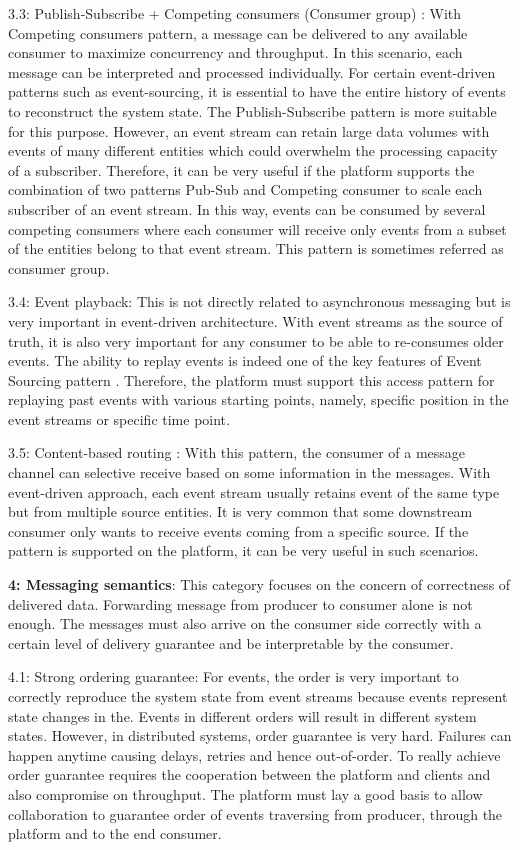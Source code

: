 3.3: Publish-Subscribe + Competing consumers (Consumer group) \cite{messagingcompetingconsumers}:
With Competing consumers pattern, a message can be delivered to any available consumer to maximize concurrency and throughput. In this scenario, each message can be interpreted and processed individually. For certain event-driven patterns such as event-sourcing, it is essential to have the entire history of events to reconstruct the system state. The Publish-Subscribe pattern is more suitable for this purpose. However, an event stream can retain large data volumes with events of many different entities which could overwhelm the processing capacity of a subscriber. Therefore, it can be very useful if the platform supports the combination of two patterns Pub-Sub and Competing consumer to scale each subscriber of an event stream. In this way, events can be consumed by several competing consumers where each consumer will receive only events from a subset of the entities belong to that event stream. This pattern is sometimes referred as consumer group.

3.4: Event playback: This is not directly related to asynchronous messaging but is very important in event-driven architecture. With event streams as the source of truth, it is also very important for any consumer to be able to re-consumes older events. The ability to replay events is indeed one of the key features of Event Sourcing pattern \cite{eventsourcingfowler}. Therefore, the platform must support this access pattern for replaying past events with various starting points, namely, specific position in the event streams or specific time point.

3.5: Content-based routing \cite{messagingcontainedbasedrouter}: 
With this pattern, the consumer of a message channel can selective receive based on some information in the messages. With event-driven approach, each event stream usually retains event of the same type but from multiple source entities. It is very common that some downstream consumer only wants to receive events coming from a specific source. If the pattern is supported on the platform, it can be very useful in such scenarios. 

\textbf{4: Messaging semantics}: This category focuses on the concern of correctness of delivered data. Forwarding message from producer to consumer alone is not enough. The messages must also arrive on the consumer side correctly with a certain level of delivery guarantee and be interpretable by the consumer. 

4.1: Strong ordering guarantee: For events, the order is very important to correctly reproduce the system state from event streams because events represent state changes in the. Events in different orders will result in different system states. However, in distributed systems, order guarantee is very hard. Failures can happen anytime causing delays, retries and hence out-of-order. To really achieve order guarantee requires the cooperation between the platform and clients and also compromise on throughput. The platform must lay a good basis to allow collaboration to guarantee order of events traversing from producer, through the platform and to the end consumer.

